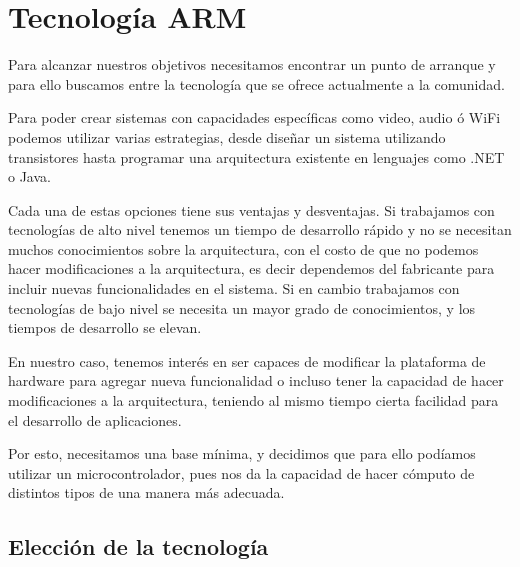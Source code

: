 \chapter{Tecnolog\'ia ARM}\label{ch:tecnologia_arm}

Para alcanzar nuestros objetivos necesitamos encontrar un punto de
arranque y para ello buscamos entre la tecnología que se ofrece actualmente
a la comunidad.

Para poder crear sistemas con capacidades específicas como video,
audio ó WiFi podemos utilizar varias estrategias, desde diseñar un
sistema utilizando transistores hasta programar una arquitectura existente
en lenguajes como .NET o Java.

Cada una de estas opciones tiene sus ventajas y desventajas. Si trabajamos
con tecnologías de alto nivel tenemos un tiempo de desarrollo rápido
y no se necesitan muchos conocimientos sobre la arquitectura, con
el costo de que no podemos hacer modificaciones a la arquitectura,
es decir dependemos del fabricante para incluir nuevas funcionalidades
en el sistema. Si en cambio trabajamos con tecnologías de bajo nivel
se necesita un mayor grado de conocimientos, y los tiempos de desarrollo
se elevan.

En nuestro caso, tenemos interés en ser capaces de modificar la plataforma
de hardware para agregar nueva funcionalidad o incluso tener la capacidad
de hacer modificaciones a la arquitectura, teniendo al mismo tiempo
cierta facilidad para el desarrollo de aplicaciones.

Por esto, necesitamos una base mínima, y decidimos que para ello podíamos
utilizar un microcontrolador, pues nos da la capacidad de hacer cómputo
de distintos tipos de una manera más adecuada. 


\section{Elecci\'on de la tecnolog\'ia}

